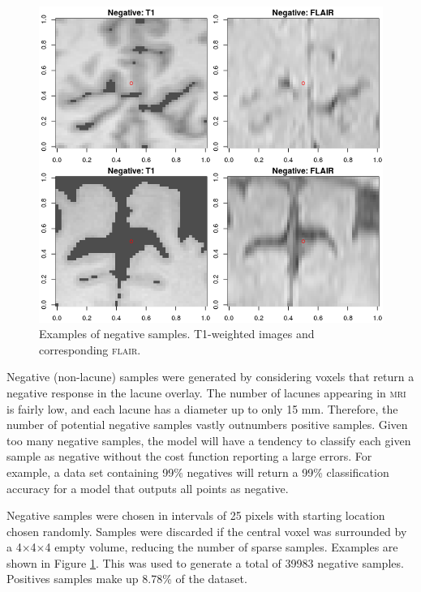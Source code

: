 \begin{figure}[ht]
\centering
\includegraphics[width=\linewidth]{Images/6_negatives.png}
\caption{Examples of negative samples. T1-weighted images and corresponding \textsc{flair}.}
\label{data-negatives}
\end{figure}

Negative (non-lacune) samples were generated by considering voxels that return a negative response in the lacune overlay. The number of lacunes appearing in \textsc{mri} is fairly low, and each lacune has a diameter up to only 15 mm. Therefore, the number of potential negative samples vastly outnumbers positive samples. Given too many negative samples, the model will have a tendency to classify each given sample as negative without the cost function reporting a large errors. For example, a data set containing 99\% negatives will return a 99\% classification accuracy for a model that outputs all points as negative.

Negative samples were chosen in intervals of 25 pixels with starting location chosen randomly. Samples were discarded if the central voxel was surrounded by a 4$\times$4$\times$4 empty volume, reducing the number of sparse samples. Examples are shown in Figure \ref{data-negatives}. This was used to generate a total of 39983 negative samples. Positives samples make up 8.78\% of the dataset.

%
%
%
%

